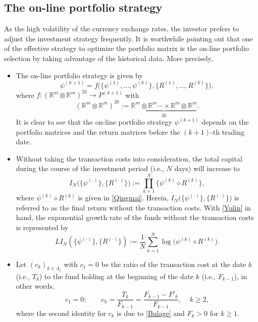 \documentclass[11pt]{article}
\numberwithin{equation}{section}
\begin{document}
\subsection{The on-line portfolio strategy}
 As the high volatility of the currency exchange rates,  the investor prefers to  adjust  the investment strategy  frequently. 
 It is worthwhile pointing out that one of the  effective strategy to optimize the portfolio matrix is the on-line portfolio selection 
 by taking advantage of the historical data. More precisely,  
\begin{itemize}
\item The on-line portfolio strategy is given by 
\begin{equation*}
\psi^{(k+1)}=f \Big(\{\psi^{(1)},...,\psi^{(k)}\},\{R^{(1)},..., R^{(k)}\}\Big),
\end{equation*}
where $f:( \mathbb{R}^m\otimes \mathbb{R} ^m)^{2k}\rightarrow P^{(k+1)}$ with 
$$( \mathbb{R}^m\otimes \mathbb{R} ^m)^{2k}:=\underbrace{ \mathbb{R}^m\otimes \mathbb{R} ^m \cdots\times  \mathbb{R}^m\otimes \mathbb{R} ^m}_{2k}.$$
It is clear to see that the  on-line portfolio strategy $\psi^{(k+1)}$ depends on the portfolio matrices and the return matrices before the $(k+1)$-th trading date. 

\item Without taking  the transaction costs into consideration, the total capital   during the course of the investment period  (i.e., $N$ days) will increase  to 
\begin{equation}\label{Yulin}
I_N\Big(\{\psi^{(\cdot)}\},\{R^{(\cdot)}\}\Big):=\prod_{k=1}^N\bigg\{ \psi^{(k)}\diamond R^{(k)}\bigg\} ,
\end{equation}
where $\psi^{(k)}\diamond R^{(k)}$ is given in \eqref{Qingmai}. Herein, $I_N\Big(\{\psi^{(\cdot)}\},\{R^{(\cdot)}\}\Big)$  is referred to as the final return  
without the transaction costs. With \eqref{Yulin} in hand,  the exponential growth rate of the funds without  the transaction costs is represented by 
\begin{equation}\label{b-p}
LI_N(\{\psi^{(\cdot)}\},\{R^{(\cdot)}\}) := \frac{1}{N}\sum_{k=1}^{N}\log \bigg( \psi^{(k)}\diamond R^{(k)}\bigg).
\end{equation}

\item Let $(c_k)_{k\in\Lambda_1}$ with $c_1=0$ be the ratio of the transaction cost at the  date $k$ (i.e., $T_k$) to the fund holding at the  beginning of the date $k$ (i.e., $F_{k-1}$), in other words, 
\begin{equation}\label{Hefei}
c_1=0; \qquad
c_k=\frac{T_k}{F_{k-1}}=\frac{F_{k-1}-F'_k}{F_{k-1}},~~~~~k\ge2,
\end{equation}
where the second identity for $c_k$ is due to \eqref{Bulage} and $F_k>0$ for $k\ge1.$


\end{itemize}
\end{document}
